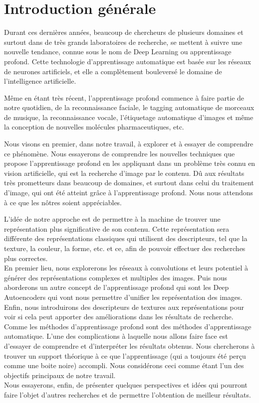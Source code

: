 
\chapter*{Introduction générale} %

	Durant ces dernières années, beaucoup de chercheurs de plusieurs domaines et surtout dans de très grands laboratoires de recherche, se mettent à suivre une nouvelle tendance, connue sous le nom de Deep Learning ou apprentissage profond. Cette technologie d'apprentissage automatique est basée sur les réseaux de neurones artificiels, et elle a complètement bouleversé le domaine de l'intelligence artificielle.
	
	Même en étant très récent, l'apprentissage profond commence à faire partie de notre quotidien, de la reconnaissance faciale, le tagging automatique de morceaux de musique, la reconnaissance vocale, l'étiquetage automatique d’images et même la conception de nouvelles molécules pharmaceutiques, etc.

	Nous visons en premier, dans notre travail, à explorer et à essayer de comprendre ce phénomène. Nous essayerons de comprendre les nouvelles techniques que propose l'apprentissage profond en les appliquant dans un problème très connu en vision artificielle, qui est la recherche d'image par le contenu. Dû aux résultats très prometteurs dans beaucoup de domaines, et surtout dans celui du traitement d'image, qui ont été atteint grâce à l'apprentissage profond. Nous nous attendons à ce que les nôtres soient appréciables.
	
	L’idée de notre approche est de permettre à la machine de trouver une représentation plus significative de son contenu. Cette représentation sera différente des représentations classiques qui utilisent des descripteurs, tel que la texture, la couleur, la forme, etc. et ce, afin de pouvoir effectuer des recherches plus correctes.\\

	En premier lieu, nous explorerons les réseaux à convolutions et leurs potentiel à générer des représentations complexes et multiples des images. Puis nous aborderons un autre concept de l'apprentissage profond qui sont les Deep Autoencoders qui vont nous permettre d'unifier les représentation des images. Enfin, nous introduirons des descripteurs de textures aux représentations pour voir si cela peut apporter des améliorations dans les résultats de recherche.\\

	Comme les méthodes d’apprentissage profond sont des méthodes d'apprentissage automatique. L'une des complications à laquelle nous allons faire face est d'essayer de comprendre et d'interpréter les résultats obtenus. Nous chercherons à trouver un support théorique à ce que l'apprentissage (qui a toujours été perçu comme une boite noire) accompli. Nous considérons ceci comme étant l'un des objectifs principaux de notre travail.\\

Nous essayerons, enfin, de présenter quelques perspectives et idées qui pourront faire l'objet d'autres recherches et de permettre l'obtention de meilleur résultats.
